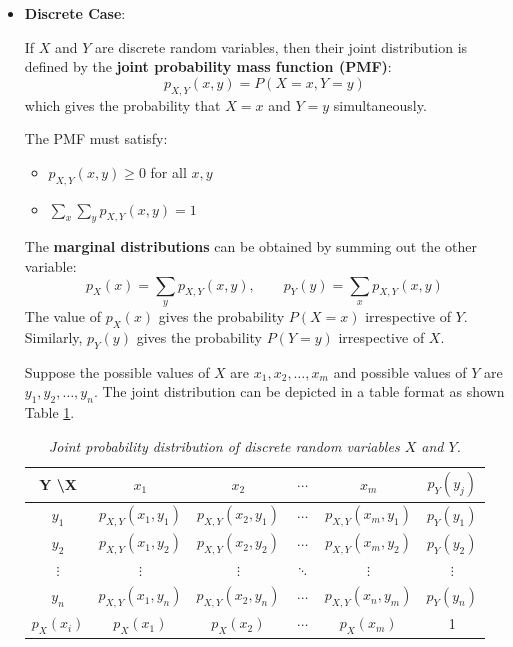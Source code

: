\documentclass[twoside]{book}
\begin{document}
\begin{itemize}

\item \textbf{Discrete Case}:

If \( X \) and \( Y \) are discrete random variables, then their joint distribution is defined by the \textbf{joint probability mass function (PMF)}:
\[
p_{X,Y}(x, y) = P(X = x, Y = y)
\]
which gives the probability that \( X = x \) and \( Y = y \) simultaneously.

The PMF must satisfy:
\begin{itemize}
  \item \( p_{X,Y}(x, y) \geq 0 \) for all \( x, y \)
  \item \( \sum_{x} \sum_{y} p_{X,Y}(x, y) = 1 \)
\end{itemize}

The \textbf{marginal distributions} can be obtained by summing out the other variable:
\[
p_X(x) = \sum_{y} p_{X,Y}(x, y), \qquad
p_Y(y) = \sum_{x} p_{X,Y}(x, y)
\]
The value of $p_X(x)$ gives the probability $P(X=x)$ irrespective of $Y$. Similarly, $p_Y(y)$ gives the probability $P(Y=y)$ irrespective of $X$.

Suppose the possible values of $X$ are $x_1, x_2, \dots, x_m$ and possible values of $Y$ are $y_1, y_2, \dots, y_n$. The joint distribution can be depicted in a table format as shown Table \ref{table:joint_distribution}.

\vspace{3mm}
\begin{table}[h!]
\centering
\renewcommand{\arraystretch}{1.5}  %
\setlength{\tabcolsep}{10pt}       %
\begin{tabular}{c|*{4}{c}|c}
\hline
\textbf{Y \textbackslash X} & \(x_1\) & \(x_2\) & \(\cdots\) & \(x_m\) & \(p_Y(y_j)\) \\
\hline
\(y_1\)     & \(p_{X,Y}({x_1, y_1})\) & \(p_{X,Y}({x_2, y_1})\) & \(\cdots\) & \(p_{X,Y}({x_m, y_1})\) & \(p_Y({y_1})\) \\
\(y_2\)     & \(p_{X,Y}({x_1, y_2})\) & \(p_{X,Y}({x_2, y_2})\) & \(\cdots\) & \(p_{X,Y}({x_m, y_2})\) & \(p_Y({y_2})\) \\
\(\vdots\)  & \(\vdots\) & \(\vdots\) & \(\ddots\) & \(\vdots\) & \(\vdots\)     \\
\(y_n\)     & \(p_{X,Y}({x_1, y_n})\) & \(p_{X,Y}({x_2, y_n})\) & \(\cdots\) & \(p_{X,Y}({x_n, y_m})\) & \(p_Y({y_n})\) \\
\hline
\(p_X(x_i)\) & \(p_X({x_1})\) & \(p_X({x_2})\) & \(\cdots\) & \(p_X({x_m})\) & 1 \\
\hline
\end{tabular}
\caption{\textit{Joint probability distribution of discrete random variables \(X\) and \(Y\).}}
\label{table:joint_distribution}
\end{table}


\end{itemize}
\end{document}
